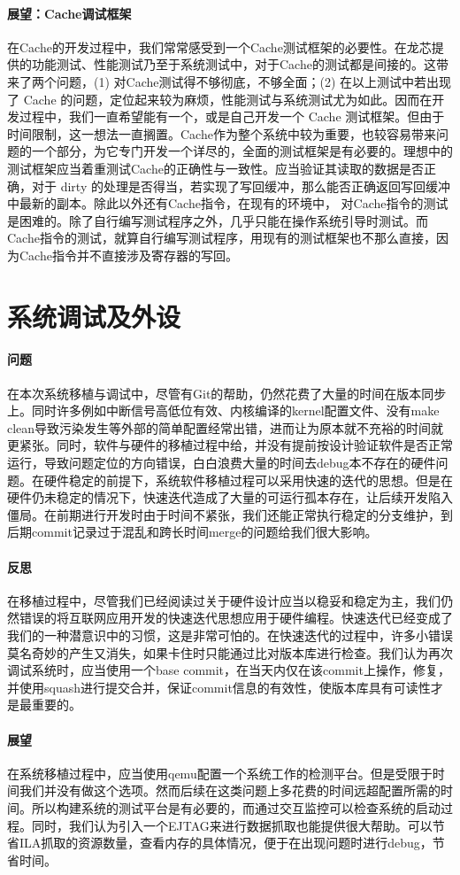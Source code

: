 \paragraph{展望：Cache调试框架} 在Cache的开发过程中，我们常常感受到一个Cache测试框架的必要性。在龙芯提供的功能测试、性能测试乃至于系统测试中，对于Cache的测试都是间接的。这带来了两个问题，(1) 对Cache测试得不够彻底，不够全面；(2) 在以上测试中若出现了 Cache 的问题，定位起来较为麻烦，性能测试与系统测试尤为如此。因而在开发过程中，我们一直希望能有一个，或是自己开发一个 Cache 测试框架。但由于时间限制，这一想法一直搁置。Cache作为整个系统中较为重要，也较容易带来问题的一个部分，为它专门开发一个详尽的，全面的测试框架是有必要的。理想中的测试框架应当着重测试Cache的正确性与一致性。应当验证其读取的数据是否正确，对于 dirty 的处理是否得当，若实现了写回缓冲，那么能否正确返回写回缓冲中最新的副本。除此以外还有Cache指令，在现有的环境中，
对Cache指令的测试是困难的。除了自行编写测试程序之外，几乎只能在操作系统引导时测试。而Cache指令的测试，就算自行编写测试程序，用现有的测试框架也不那么直接，因为Cache指令并不直接涉及寄存器的写回。




\section{系统调试及外设}

\paragraph{问题} 在本次系统移植与调试中，尽管有Git的帮助，仍然花费了大量的时间在版本同步上。同时许多例如中断信号高低位有效、内核编译的kernel配置文件、没有make clean导致污染发生等外部的简单配置经常出错，进而让为原本就不充裕的时间就更紧张。同时，软件与硬件的移植过程中给，并没有提前按设计验证软件是否正常运行，导致问题定位的方向错误，白白浪费大量的时间去debug本不存在的硬件问题。在硬件稳定的前提下，系统软件移植过程可以采用快速的迭代的思想。但是在硬件仍未稳定的情况下，快速迭代造成了大量的可运行孤本存在，让后续开发陷入僵局。在前期进行开发时由于时间不紧张，我们还能正常执行稳定的分支维护，到后期commit记录过于混乱和跨长时间merge的问题给我们很大影响。

\paragraph{反思} 在移植过程中，尽管我们已经阅读过关于硬件设计应当以稳妥和稳定为主，我们仍然错误的将互联网应用开发的快速迭代思想应用于硬件编程。快速迭代已经变成了我们的一种潜意识中的习惯，这是非常可怕的。在快速迭代的过程中，许多小错误莫名奇妙的产生又消失，如果卡住时只能通过比对版本库进行检查。我们认为再次调试系统时，应当使用一个base commit，在当天内仅在该commit上操作，修复，并使用squash进行提交合并，保证commit信息的有效性，使版本库具有可读性才是最重要的。

\paragraph{展望} 在系统移植过程中，应当使用qemu配置一个系统工作的检测平台。但是受限于时间我们并没有做这个选项。然而后续在这类问题上多花费的时间远超配置所需的时间。所以构建系统的测试平台是有必要的，而通过交互监控可以检查系统的启动过程。同时，我们认为引入一个EJTAG来进行数据抓取也能提供很大帮助。可以节省ILA抓取的资源数量，查看内存的具体情况，便于在出现问题时进行debug，节省时间。

